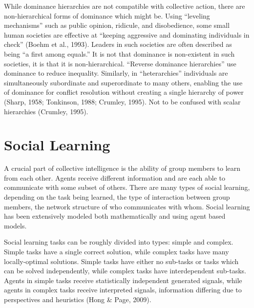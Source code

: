 While dominance hierarchies are not compatible with collective action, there are non-hierarchical forms of dominance which might be. Using ``leveling mechanisms'' such as public opinion, ridicule, and disobedience, some small human societies are effective at ``keeping aggressive and dominating individuals in check'' (Boehm et al., 1993). Leaders in such societies are often described as being ``a first among equals.'' It is not that dominance is non-existent in such societies, it is that it is non-hierarchical. ``Reverse dominance hierarchies'' use dominance to reduce inequality. Similarly, in ``heterarchies'' individuals are simultaneously subordinate and superordinate to many others, enabling the use of dominance for conflict resolution without creating a single hierarchy of power (Sharp, 1958; Tonkinson, 1988; Crumley, 1995). Not to be confused with scalar hierarchies (Crumley, 1995).

\section{Social Learning}
A crucial part of collective intelligence is the ability of group members to learn from each other. Agents receive different information and are each able to communicate with some subset of others. There are many types of social learning, depending on the task being learned, the type of interaction between group members, the network structure of who communicates with whom. Social learning has been extensively modeled both mathematically and using agent based models.

Social learning tasks can be roughly divided into types: simple and complex. Simple tasks have a single correct solution, while complex tasks have many locally-optimal solutions. Simple tasks have either no sub-tasks or tasks which can be solved independently, while complex tasks have interdependent sub-tasks. Agents in simple tasks receive statistically independent generated signals, while agents in complex tasks receive interpreted signals, information differing due to perspectives and heuristics (Hong \& Page, 2009).

